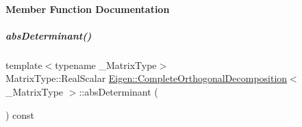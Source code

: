 \paragraph{Member Function Documentation}
\mbox{\label{group___q_r___module_a8a9b53dbe4665224699f06d6635d75b7}} 
\subparagraph{\texorpdfstring{abs\+Determinant()}{absDeterminant()}\hspace{0.1cm}{\footnotesize\ttfamily [1/2]}}
{\footnotesize\ttfamily template$<$typename \+\_\+\+Matrix\+Type$>$ \\
Matrix\+Type\+::\+Real\+Scalar \hyperlink{group___q_r___module_class_eigen_1_1_complete_orthogonal_decomposition}{Eigen\+::\+Complete\+Orthogonal\+Decomposition}$<$ \+\_\+\+Matrix\+Type $>$\+::abs\+Determinant (\begin{DoxyParamCaption}{ }\end{DoxyParamCaption}) const}

